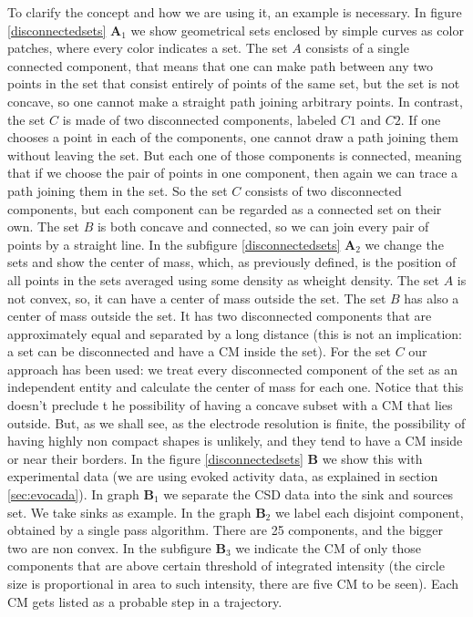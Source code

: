 \documentclass[letterpaper,12pts]{article}
\newcommand{\ts}[1]{$_{\text{#1}}$}
\begin{document}
To clarify the concept and how we are using it, an example is necessary. In figure \ref{disconnectedsets} \textbf{A\ts{1}} we show geometrical sets enclosed by simple curves as color patches, where every color indicates a set. The set $A$ consists of a single connected component, that means that one can make  path between any two points in the set that consist entirely of points of the same set, but the set is not concave, so
one cannot make a straight path joining arbitrary points. In contrast, the set $C$ is made of two disconnected components, labeled $C1$ and $C2$. If one chooses a point in each of the components, one cannot draw a path joining them without leaving the set. But each one of those components is connected, meaning that if we choose the pair of points in one component, then again we can trace a path joining them in the set. So the set $C$ consists of two disconnected components, but each component can be regarded as a connected set on their own. The set $B$ is both concave and connected, so we can join every pair of
points by a straight line. 
In the subfigure \ref{disconnectedsets} \textbf{A\ts{2}} we change the sets and show the center of mass, which, as previously defined, is the position of all points in the sets averaged using some density as wheight density.  The set $A$ is not convex, so, it can have a center of mass outside the set. The
set $B$ has also a center of mass outside the set. It has two disconnected components that are approximately
equal and separated by a long distance (this is not an implication: a set can be disconnected and have
a CM inside the set). For the set $C$ our approach has been used: we treat every disconnected component of the
set as an independent entity and calculate the center of mass for each one. Notice that this doesn't preclude t
he possibility of having a concave subset with a CM that lies outside. But, as we shall see,
as the electrode resolution is finite, the possibility of having highly non compact shapes is unlikely, and they
tend to have a CM inside or near their borders. In the figure \ref{disconnectedsets}
\textbf{B} we show this with experimental
data (we are using evoked activity data, as explained in section \ref{sec:evocada}). In graph
\textbf{B\ts{1}} we
separate the CSD data into the sink and sources set. We take sinks as example. In the graph
\textbf{B\ts{2}}
we label each disjoint component, obtained by a single pass algorithm. There are 25 components, and
the bigger two are non convex. In the
subfigure \textbf{B\ts{3}}
we indicate the CM of only those components that are above certain threshold of
integrated intensity (the circle size  is proportional in area to such intensity, there are five CM to be
seen). Each CM gets listed as a probable step in a trajectory.
\end{document}

